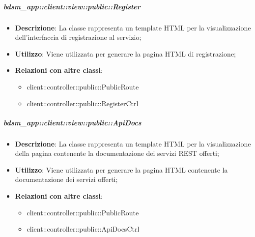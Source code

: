 		\subparagraph{bdsm\_app::client::view::public::Register} %
		\label{subp:bdsm_app_client_view_public_register}
			\begin{itemize}
				\item \textbf{Descrizione}: La classe rappresenta un template HTML per la visualizzazione dell'interfaccia di registrazione al servizio;
				\item \textbf{Utilizzo}: Viene utilizzata per generare la pagina HTML di registrazione;
				\item \textbf{Relazioni con altre classi}:
					\begin{itemize}
						\item client::controller::public::PublicRoute
						\item client::controller::public::RegisterCtrl
					\end{itemize}
			\end{itemize}

		\subparagraph{bdsm\_app::client::view::public::ApiDocs} %
		\label{subp:bdsm_app_client_view_public_apidocs}
			\begin{itemize}
				\item \textbf{Descrizione}: La classe rappresenta un template HTML per la visualizzazione della pagina contenente la documentazione dei servizi REST offerti;
				\item \textbf{Utilizzo}: Viene utilizzata per generare la pagina HTML contenente la documentazione dei servizi offerti;
				\item \textbf{Relazioni con altre classi}:
					\begin{itemize}
						\item client::controller::public::PublicRoute
						\item client::controller::public::ApiDocsCtrl
					\end{itemize}
			\end{itemize}



